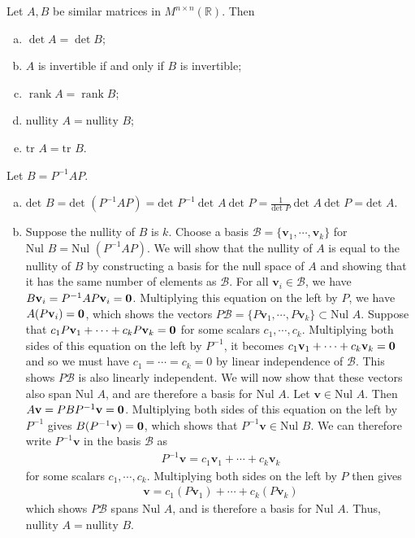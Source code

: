 \documentclass[12pt,letterpaper,reqno]{article}
\numberwithin{equation}{section}
\newcommand{\R}{\ensuremath{\mathbb R}}
\newcommand{\bv}{\mathbf{v}}
\newcommand{\nullity}{\text{nullity }}
\DeclareMathOperator{\rank}{rank}
\begin{document}
\newpage 
\begin{thm}\label{thm:similarity_invariants}
	Let $A,B$ be similar matrices in $M^{n \times n}(\R)$. Then
	\begin{enumerate}[(a)]
		\item $\det A=\det B$;
		\item $A$ is invertible if and only if $B$ is invertible;
		\item $\rank A= \rank B$;
		\item $\nullity A=\nullity B$;
		\item $\text{tr } A=\text{tr } B$.
	\end{enumerate}
\end{thm}
\begin{pf}
Let $B=P^{-1}AP$.
	\begin{enumerate}[(a)]
		\item $\text{det }B=\text{det }(P^{-1}AP)=\text{det }P^{-1} \ \text{det }A \ \text{det }P=\frac{1}{\text{det }P} \ \text{det }A \ \text{det }P=\text{det }A$.
		\item Suppose the nullity of $B$ is $k$. Choose a basis $\mathcal{B}=\{\bv_1, \cdots, \bv_k\}$ for $\text{Nul }B=\text{Nul }(P^{-1}AP)$. We will show  that the nullity of $A$ is equal to the nullity of $B$ by constructing a basis for the null space of $A$ and showing that it has the same number of elements as $\mathcal{B}$. For all $\bv_i \in \mathcal{B}$, we have $B\bv_i=P^{-1}AP\bv_i={\bf 0}$. Multiplying this equation on the left by $P$, we have $A(P\bv_i)={\bf 0}$, which shows the vectors $P\mathcal{B}=\{P\bv_1,\cdots,P\bv_k\} \subset \text{Nul }A$. Suppose that $c_1P\bv_1+\cdots + c_kP\bv_k={\bf 0}$ for some scalars $c_1,\cdots, c_k$. Multiplying both sides of this equation on the left by $P^{-1}$, it becomes $c_1\bv_1+\cdots+c_k\bv_k={\bf 0}$ and so we must have $c_1=\cdots=c_k=0$ by linear independence of $\mathcal{B}$. This shows $P\mathcal{B}$ is also linearly independent. We will now show that these vectors also span $\text{Nul }A$, and are therefore a basis for $\text{Nul }A$. Let $\bv \in \text{Nul }A$. Then $A\bv=PBP^{-1}\bv={\bf 0}$. Multiplying both sides of this equation on the left by $P^{-1}$ gives $B(P^{-1}\bv)={\bf 0}$, which shows that $P^{-1}\bv \in \text{Nul }B$. We can therefore write $P^{-1}\bv$ in the basis $\mathcal{B}$ as 
		\begin{align*}
			P^{-1}\bv=c_1\bv_1+\cdots+c_k\bv_k
		\end{align*}
		for some scalars $c_1,\cdots,c_k$. Multiplying both sides on the left by $P$ then gives
		\begin{align*}
			\bv = c_1(P\bv_1)+\cdots+c_k(P\bv_k)
		\end{align*}
		which shows $P\mathcal{B}$ spans $\text{Nul }A$, and is therefore a basis for $\text{Nul }A$. Thus, $\text{nullity }A=\text{nullity }B$.
	

\end{enumerate}
\end{pf}
\end{document}
